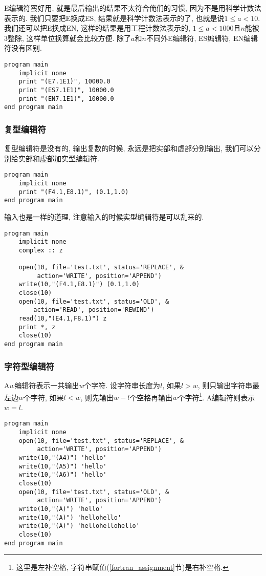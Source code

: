 E编辑符蛮好用, 就是最后输出的结果不太符合俺们的习惯, 因为不是用科学计数法表示的. 我们只要把E换成ES, 结果就是科学计数法表示的了, 也就是说$1\leqslant a<10$. 我们还可以把E换成EN, 这样的结果是用工程计数法表示的, $1\leqslant a<1000$且$n$能被$3$整除, 这样单位换算就会比较方便. 除了$a$和$n$不同外E编辑符, ES编辑符, EN编辑符没有区别.
\begin{verbatim}
program main
    implicit none
    print "(E7.1E1)", 10000.0
    print "(ES7.1E1)", 10000.0
    print "(EN7.1E1)", 10000.0
end program main
\end{verbatim}

\subsubsection{复型编辑符}

复型编辑符是没有的, 输出复数的时候, 永远是把实部和虚部分别输出, 我们可以分别给实部和虚部加实型编辑符.
\begin{verbatim}
program main
    implicit none
    print "(F4.1,E8.1)", (0.1,1.0)
end program main
\end{verbatim}
输入也是一样的道理, 注意输入的时候实型编辑符是可以乱来的.
\begin{verbatim}
program main
    implicit none
    complex :: z

    open(10, file='test.txt', status='REPLACE', &
         action='WRITE', position='APPEND')
    write(10,"(F4.1,E8.1)") (0.1,1.0)
    close(10)
    open(10, file='test.txt', status='OLD', &
        action='READ', position='REWIND')
    read(10,"(E4.1,F8.1)") z
    print *, z
    close(10)
end program main
\end{verbatim}

\subsubsection{字符型编辑符}

A$w$编辑符表示一共输出$w$个字符. 设字符串长度为$l$, 如果$l>w$, 则只输出字符串最左边$w$个字符, 如果$l<w$, 则先输出$w-l$个空格再输出$w$个字符\footnote{这里是左补空格, 字符串赋值(\ref{fortran_assignment}节)是右补空格.}. A编辑符则表示$w=l$.
\begin{verbatim}
program main
    implicit none
    open(10, file='test.txt', status='REPLACE', &
         action='WRITE', position='APPEND')
    write(10,"(A4)") 'hello'
    write(10,"(A5)") 'hello'
    write(10,"(A6)") 'hello'
    close(10)
    open(10, file='test.txt', status='OLD', &
         action='WRITE', position='APPEND')
    write(10,"(A)") 'hello'
    write(10,"(A)") 'hellohello'
    write(10,"(A)") 'hellohellohello'
    close(10)
end program main
\end{verbatim}


